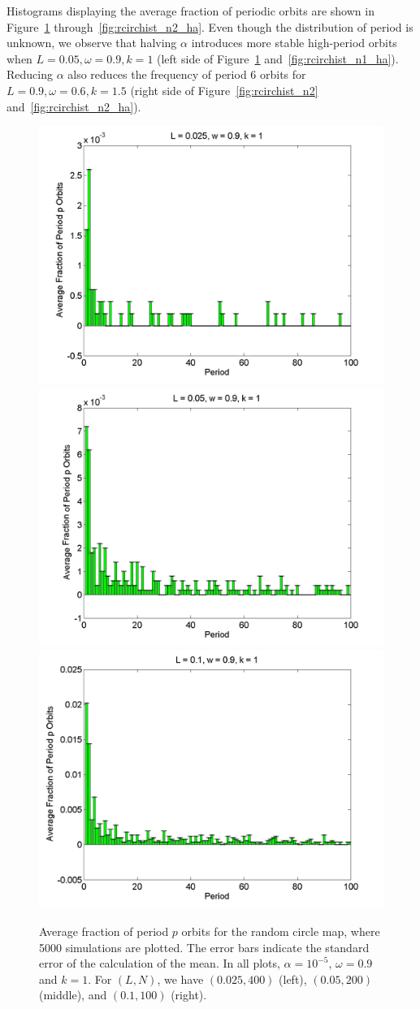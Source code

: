 Histograms displaying the average fraction of periodic orbits are shown
in Figure~\ref{fig:rcirchist_n1}
through~\ref{fig:rcirchist_n2_ha}. Even though the distribution of
period is unknown, we observe that halving $\alpha$ introduces more
stable high-period orbits when $L=0.05,\omega=0.9,k=1$ (left side of
Figure~\ref{fig:rcirchist_n1} and~\ref{fig:rcirchist_n1_ha}). Reducing
$\alpha$ also reduces the frequency of period 6 orbits for
$L=0.9,\omega=0.6,k=1.5$ (right side of Figure~\ref{fig:rcirchist_n2} and~\ref{fig:rcirchist_n2_ha}).

\begin{figure}[H]\linespread{1}
\caption[Average fraction of period $p$ orbits for the random circle
map (normal distribution), for $\alpha = 10^{-5}$, $\omega=0.9$ and $k=1$]{Average fraction of period $p$ orbits for the random circle
map, where 5000 simulations are plotted. The error bars indicate
the standard error of the calculation of the mean. In all plots,
$\alpha = 10^{-5}$, $\omega=0.9$ and $k=1$. For $(L,N)$,
we have $(0.025, 400)$ (left), $(0.05, 200)$
(middle), and $(0.1, 100)$ (right).}\label{fig:rcirchist_n1}
	\begin{center}
\includegraphics[width=.33\textwidth]{figs/rcirc_hist_n_L_0025_w_09_k_1_sims_5000.png}\hfill
\includegraphics[width=.33\textwidth]{figs/rcirc_hist_n_L_005_w_09_k_1_sims_5000.png}\hfill
\includegraphics[width=.33\textwidth]{figs/rcirc_hist_n_L_01_w_09_k_1_sims_5000.png}
	\end{center}
\end{figure}

